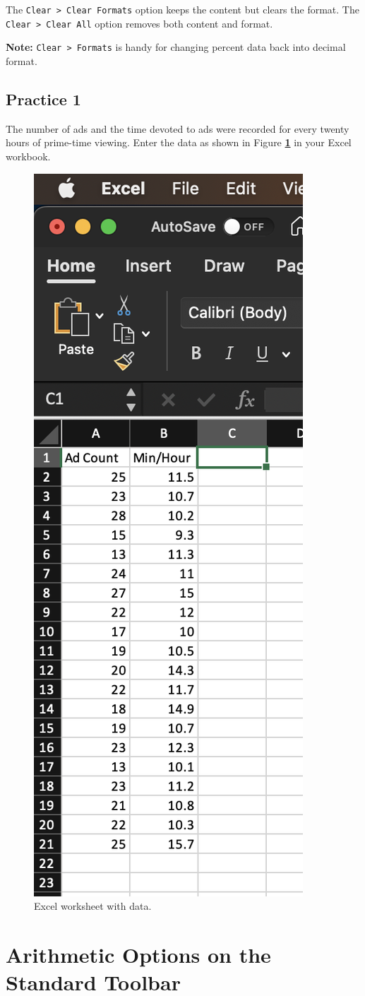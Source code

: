 \documentclass[
]{book}
\begin{document}
The \texttt{Clear\ \textgreater{}\ Clear\ Formats} option keeps the content but clears the format. The \texttt{Clear\ \textgreater{}\ Clear\ All} option removes both content and format.

\textbf{Note:} \texttt{Clear\ \textgreater{}\ Formats} is handy for changing percent data back into decimal format.

\hypertarget{practice-1}{%
\subsection{Practice 1}\label{practice-1}}

The number of ads and the time devoted to ads were recorded for every twenty hours of prime-time viewing. Enter the data as shown in Figure \textbf{\ref{fig:entering-data}} in your Excel workbook.

\begin{figure}

{\centering \includegraphics[width=0.35\linewidth]{images/entering_data} 

}

\caption{Excel worksheet with data.}\label{fig:entering-data}
\end{figure}

\hypertarget{arithmetic-options-on-the-standard-toolbar}{%
\section{Arithmetic Options on the Standard Toolbar}\label{arithmetic-options-on-the-standard-toolbar}}
\end{document}
